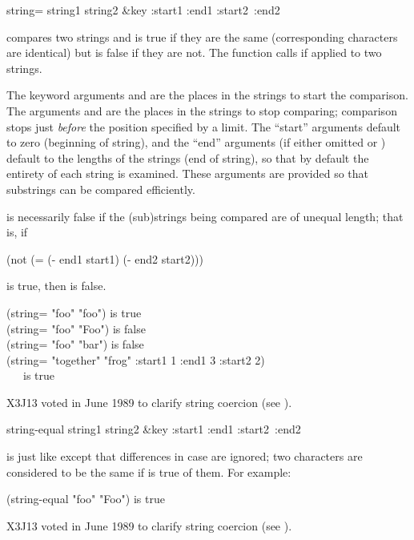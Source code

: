 \begin{defun}[Function]
string= string1 string2 &key :start1 :end1 :start2~:end2

 compares two strings and is true if
they are the same (corresponding characters are identical)
but is false if they are not.
The function  calls  if
applied to two strings.

The keyword arguments  and  are the places
in the strings to start the comparison.
The arguments  and  are the
places in the strings to stop comparing; comparison stops just
\emph{before} the position specified by a limit.
The ``start'' arguments default to zero (beginning of string),
and the ``end'' arguments (if either omitted or {\false})
default to the lengths of the strings (end of string),
so that by default the entirety of each string is examined.
These arguments are provided so that substrings can be compared
efficiently.

 is necessarily false if the (sub)strings
being compared are of unequal length; that is, if
\begin{lisp}
(not (= (- end1 start1) (- end2 start2)))
\end{lisp}
is true, then  is false.

\begin{lisp}
(string= "foo" "foo") \textrm{is true} \\
(string= "foo" "Foo") \textrm{is false} \\
(string= "foo" "bar") \textrm{is false} \\
(string= "together" "frog" :start1 1 :end1 3 :start2 2) \\
~~~\textrm{is true}
\end{lisp}

\begin{newer}
X3J13 voted in June 1989 
to clarify string coercion (see ).
\end{newer}
\end{defun}

\begin{defun}[Function]
string-equal string1 string2 &key :start1 :end1 :start2~:end2

 is just like  except that differences
in case are ignored; two characters are considered to be the same
if  is true of them.
For example:
\begin{lisp}
(string-equal "foo" "Foo") \textrm{is true}
\end{lisp}

\begin{newer}
X3J13 voted in June 1989 
to clarify string coercion (see ).
\end{newer}
\end{defun}

